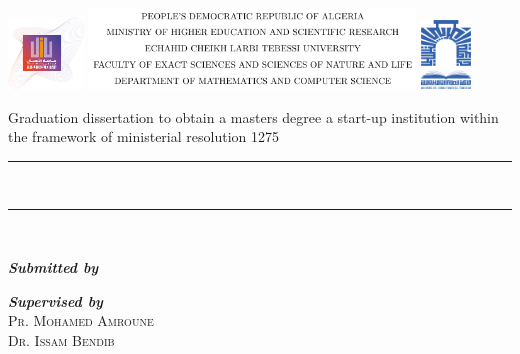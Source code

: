 \begin{titlepage}
	\includegraphics[width=0.15\textwidth]{./images/incubator.png}\hfill
	\includegraphics[width=0.65\textwidth]{./images/title.png}\hfill
	\includegraphics[width=0.1\textwidth]{./images/university.png}
	\begin{center}
		\Large{Graduation dissertation to obtain a masters degree a start-up institution within the framework of ministerial resolution 1275}\\[0.5cm]
		\rule{\textwidth}{0.075cm}\\[0.4cm]
		\textsc{\huge \bfseries \@title}
		\rule{\textwidth}{0.075cm}\\[2cm]
		\begin{minipage}{0.4\textwidth}
			\begin{flushleft}
				\emph{\textbf{Submitted by}}\\
				\textsc{\@author}
			\end{flushleft}
		\end{minipage}
		\begin{minipage}{0.4\textwidth}
			\begin{flushright}
				\emph{\textbf{Supervised by}}\\
				\textsc{Pr. Mohamed Amroune}\\
				\textsc{Dr. Issam Bendib}
			\end{flushright}

\end{minipage}
\end{center}
\end{titlepage}
